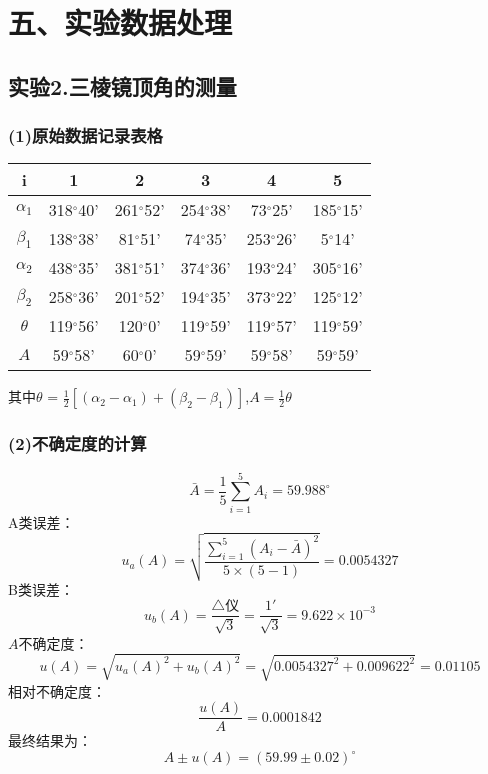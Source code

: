 \documentclass[11pt,a4paper,oneside]{article}
\begin{document}
\section*{五、实验数据处理}\subsection*{实验2.三棱镜顶角的测量}
\subsubsection*{(1)原始数据记录表格}

\begin{center}

\begin{tabular}{|c|c|c|c|c|c|}
\hline
i & 1 & 2 & 3 & 4 & 5 \\
\hline
${\alpha}_1$
&318$^{\circ}$40'&261$^{\circ}$52'&254$^{\circ}$38'&73$^{\circ}$25'&185$^{\circ}$15'
\\
\hline
${\beta}_1$
&138$^{\circ}$38'&81$^{\circ}$51'&74$^{\circ}$35'&253$^{\circ}$26'&5$^{\circ}$14'
\\
\hline
${\alpha}_2$
&438$^{\circ}$35'&381$^{\circ}$51'&374$^{\circ}$36'&193$^{\circ}$24'&305$^{\circ}$16'
\\
\hline
${\beta}_2$
&258$^{\circ}$36'&201$^{\circ}$52'&194$^{\circ}$35'&373$^{\circ}$22'&125$^{\circ}$12'
\\
\hline
${\theta}$
&119$^{\circ}$56'&120$^{\circ}$0'&119$^{\circ}$59'&119$^{\circ}$57'&119$^{\circ}$59'
\\
\hline
$A$
&59$^{\circ}$58'&60$^{\circ}$0'&59$^{\circ}$59'&59$^{\circ}$58'&59$^{\circ}$59'
\\
\hline
\end{tabular}
\vspace{10pt}

其中$\theta$ = $\displaystyle\frac{1}{2}[({\alpha}_2-{\alpha_1})+({\beta}_2-{\beta}_1)]$,$A=\displaystyle\frac{1}{2}{\theta}$

\end{center}

\subsubsection*{(2)不确定度的计算}

$$\bar{A} =\frac{1}{5}\sum\limits_{i=1}^{5}{A_i}=59.988 ^{\circ} $$
A类误差：$$u_a({A})=\sqrt{\displaystyle\frac{\sum\limits_{i=1}^{5} ({A}_i-\bar{A})^2}{5{\times}(5-1)}}=0.0054327 $$
B类误差：$$u_b({A})=\displaystyle\frac{\bigtriangleup\text{仪}}{\sqrt{3}}
= \frac{1'}{\sqrt{3}} = 9.622 \times 10^{-3} $$
${A}$不确定度：$$u({A})=\sqrt{{u_a({A})}^2+{u_b({A})}^2}=\sqrt{ 0.0054327^2 + 0.009622^2} = 0.01105 $$
相对不确定度：$$\displaystyle\frac{u(A)}{A}=0.0001842$$
最终结果为：$$A{\pm}u(A) = (59.99 {\pm} 0.02) ^{\circ}$$
\end{document}
